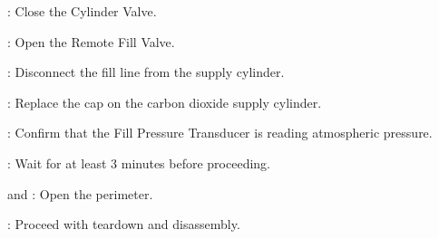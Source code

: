 \begin{checklist}
    \item \primary{}: Close the Cylinder Valve.
    \item \primary{}: Open the Remote Fill Valve.
    \item \primary{}: Disconnect the fill line from the supply cylinder.
    \item \primary{}: Replace the cap on the carbon dioxide supply cylinder.
    \item \daq{}: Confirm that the Fill Pressure Transducer is reading atmospheric pressure.
    \item \ops{}: Wait for at least 3 minutes before proceeding.
    \item \peri{} and \perii{}: Open the perimeter.
    \item \ops{}: Proceed with teardown and disassembly.

\end{checklist}
\setcounter{checklistnum}{0}

\newpage
    
